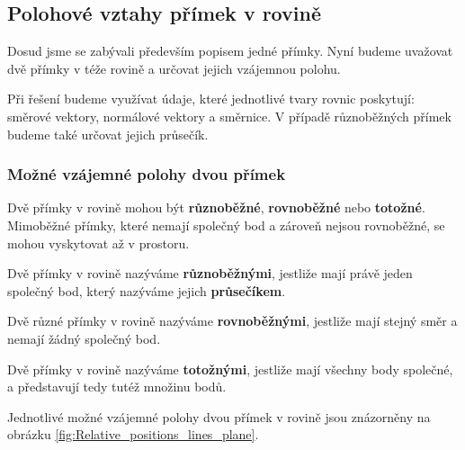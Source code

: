 \subsection{Polohové vztahy přímek v rovině}
\label{subsec:Positional_relations_lines_plane}

Dosud jsme se zabývali především popisem jedné přímky. Nyní budeme
uvažovat dvě přímky v téže rovině a určovat jejich vzájemnou polohu.

Při řešení budeme využívat údaje, které jednotlivé tvary rovnic
poskytují: směrové vektory, normálové vektory a směrnice. V případě
různoběžných přímek budeme také určovat jejich průsečík.

\subsubsection{Možné vzájemné polohy dvou přímek}
\label{subsubsec:Possible_relative_positions_lines}

Dvě přímky v rovině mohou být \textbf{různoběžné},
\textbf{rovnoběžné} nebo \textbf{totožné}. Mimoběžné přímky,
které nemají společný bod a zároveň nejsou rovnoběžné, se mohou
vyskytovat až v prostoru.

\begin{definition}\label{def:Intersecting_lines_plane}
    Dvě přímky v rovině nazýváme \textbf{různoběžnými}, jestliže mají
    právě jeden společný bod, který nazýváme jejich
    \textbf{průsečíkem}.
\end{definition}

\begin{definition}\label{def:Parallel_lines_plane}
    Dvě různé přímky v rovině nazýváme \textbf{rovnoběžnými}, jestliže
    mají stejný směr a nemají žádný společný bod.
\end{definition}

\begin{definition}\label{def:Coincident_lines_plane}
    Dvě přímky v rovině nazýváme \textbf{totožnými}, jestliže mají
    všechny body společné, a představují tedy tutéž množinu bodů.
\end{definition}

Jednotlivé možné vzájemné polohy dvou přímek v rovině jsou znázorněny
na obrázku \ref{fig:Relative_positions_lines_plane}.

